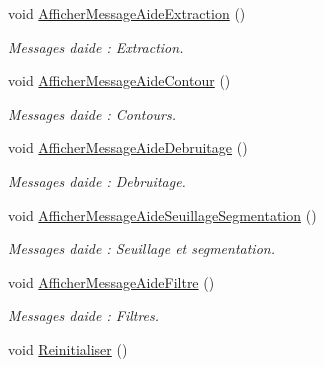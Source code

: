 \begin{DoxyCompactItemize}
void \hyperlink{classMainWindow_a0686a5e005ce5ad4c4bea3a6224b552d}{Afficher\+Message\+Aide\+Extraction} ()
\begin{DoxyCompactList}\small\item\em Messages d\textquotesingle{}aide \+: Extraction. \end{DoxyCompactList}\item 
\mbox{\label{classMainWindow_ac243627f25330122f272623cc1e87736}} 
void \hyperlink{classMainWindow_ac243627f25330122f272623cc1e87736}{Afficher\+Message\+Aide\+Contour} ()
\begin{DoxyCompactList}\small\item\em Messages d\textquotesingle{}aide \+: Contours. \end{DoxyCompactList}\item 
\mbox{\label{classMainWindow_ab3fd048b197f1854d173268ec4de9741}} 
void \hyperlink{classMainWindow_ab3fd048b197f1854d173268ec4de9741}{Afficher\+Message\+Aide\+Debruitage} ()
\begin{DoxyCompactList}\small\item\em Messages d\textquotesingle{}aide \+: Debruitage. \end{DoxyCompactList}\item 
\mbox{\label{classMainWindow_aae084a3e268d6651c65cebda3dae97ff}} 
void \hyperlink{classMainWindow_aae084a3e268d6651c65cebda3dae97ff}{Afficher\+Message\+Aide\+Seuillage\+Segmentation} ()
\begin{DoxyCompactList}\small\item\em Messages d\textquotesingle{}aide \+: Seuillage et segmentation. \end{DoxyCompactList}\item 
\mbox{\label{classMainWindow_a848fc8dfd5998110e4e9ca090888d1d0}} 
void \hyperlink{classMainWindow_a848fc8dfd5998110e4e9ca090888d1d0}{Afficher\+Message\+Aide\+Filtre} ()
\begin{DoxyCompactList}\small\item\em Messages d\textquotesingle{}aide \+: Filtres. \end{DoxyCompactList}\item 
\mbox{\label{classMainWindow_a114d78d426978460d4754dd60203b7f5}} 
void \hyperlink{classMainWindow_a114d78d426978460d4754dd60203b7f5}{Reinitialiser} ()

\end{DoxyCompactItemize}
